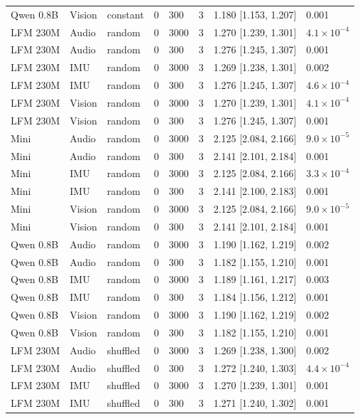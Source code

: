 {\begin{longtable}{@{}llllllll@{}}
Qwen 0.8B & Vision & constant & 0 & 300 & 3 & 1.180 [1.153, 1.207] & 0.001 \\
LFM 230M & Audio & random & 0 & 3000 & 3 & 1.270 [1.239, 1.301] & $4.1\times10^{-4}$ \\
LFM 230M & Audio & random & 0 & 300 & 3 & 1.276 [1.245, 1.307] & 0.001 \\
LFM 230M & IMU & random & 0 & 3000 & 3 & 1.269 [1.238, 1.301] & 0.002 \\
LFM 230M & IMU & random & 0 & 300 & 3 & 1.276 [1.245, 1.307] & $4.6\times10^{-4}$ \\
LFM 230M & Vision & random & 0 & 3000 & 3 & 1.270 [1.239, 1.301] & $4.1\times10^{-4}$ \\
LFM 230M & Vision & random & 0 & 300 & 3 & 1.276 [1.245, 1.307] & 0.001 \\
Mini & Audio & random & 0 & 3000 & 3 & 2.125 [2.084, 2.166] & $9.0\times10^{-5}$ \\
Mini & Audio & random & 0 & 300 & 3 & 2.141 [2.101, 2.184] & 0.001 \\
Mini & IMU & random & 0 & 3000 & 3 & 2.125 [2.084, 2.166] & $3.3\times10^{-4}$ \\
Mini & IMU & random & 0 & 300 & 3 & 2.141 [2.100, 2.183] & 0.001 \\
Mini & Vision & random & 0 & 3000 & 3 & 2.125 [2.084, 2.166] & $9.0\times10^{-5}$ \\
Mini & Vision & random & 0 & 300 & 3 & 2.141 [2.101, 2.184] & 0.001 \\
Qwen 0.8B & Audio & random & 0 & 3000 & 3 & 1.190 [1.162, 1.219] & 0.002 \\
Qwen 0.8B & Audio & random & 0 & 300 & 3 & 1.182 [1.155, 1.210] & 0.001 \\
Qwen 0.8B & IMU & random & 0 & 3000 & 3 & 1.189 [1.161, 1.217] & 0.003 \\
Qwen 0.8B & IMU & random & 0 & 300 & 3 & 1.184 [1.156, 1.212] & 0.001 \\
Qwen 0.8B & Vision & random & 0 & 3000 & 3 & 1.190 [1.162, 1.219] & 0.002 \\
Qwen 0.8B & Vision & random & 0 & 300 & 3 & 1.182 [1.155, 1.210] & 0.001 \\
LFM 230M & Audio & shuffled & 0 & 3000 & 3 & 1.269 [1.238, 1.300] & 0.002 \\
LFM 230M & Audio & shuffled & 0 & 300 & 3 & 1.272 [1.240, 1.303] & $4.4\times10^{-4}$ \\
LFM 230M & IMU & shuffled & 0 & 3000 & 3 & 1.270 [1.239, 1.301] & 0.001 \\
LFM 230M & IMU & shuffled & 0 & 300 & 3 & 1.271 [1.240, 1.302] & 0.001 \\

\end{longtable}}
